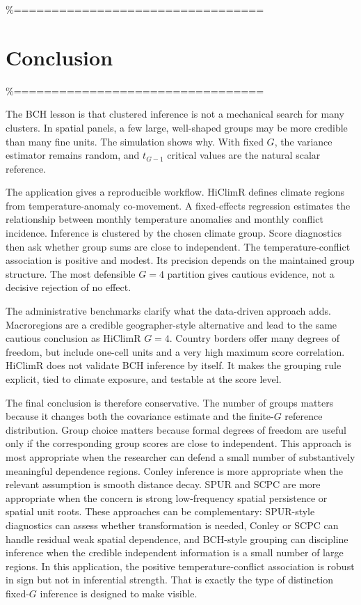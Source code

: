 \documentclass[
]{article}
\begin{document}
\%=================================

\section{Conclusion}

\%=================================

The BCH lesson is that clustered inference is not a mechanical search
for many clusters. In spatial panels, a few large, well-shaped groups
may be more credible than many fine units. The simulation shows why.
With fixed \(G\), the variance estimator remains random, and \(t_{G-1}\)
critical values are the natural scalar reference.

The application gives a reproducible workflow. HiClimR defines climate
regions from temperature-anomaly co-movement. A fixed-effects regression
estimates the relationship between monthly temperature anomalies and
monthly conflict incidence. Inference is clustered by the chosen climate
group. Score diagnostics then ask whether group sums are close to
independent. The temperature-conflict association is positive and
modest. Its precision depends on the maintained group structure. The
most defensible \(G=4\) partition gives cautious evidence, not a
decisive rejection of no effect.

The administrative benchmarks clarify what the data-driven approach
adds. Macroregions are a credible geographer-style alternative and lead
to the same cautious conclusion as HiClimR \(G=4\). Country borders
offer many degrees of freedom, but include one-cell units and a very
high maximum score correlation. HiClimR does not validate BCH inference
by itself. It makes the grouping rule explicit, tied to climate
exposure, and testable at the score level.

The final conclusion is therefore conservative. The number of groups
matters because it changes both the covariance estimate and the
finite-\(G\) reference distribution. Group choice matters because formal
degrees of freedom are useful only if the corresponding group scores are
close to independent. This approach is most appropriate when the
researcher can defend a small number of substantively meaningful
dependence regions. Conley inference is more appropriate when the
relevant assumption is smooth distance decay. SPUR and SCPC are more
appropriate when the concern is strong low-frequency spatial persistence
or spatial unit roots. These approaches can be complementary: SPUR-style
diagnostics can assess whether transformation is needed, Conley or SCPC
can handle residual weak spatial dependence, and BCH-style grouping can
discipline inference when the credible independent information is a
small number of large regions. In this application, the positive
temperature-conflict association is robust in sign but not in
inferential strength. That is exactly the type of distinction
fixed-\(G\) inference is designed to make visible.


\end{document}
